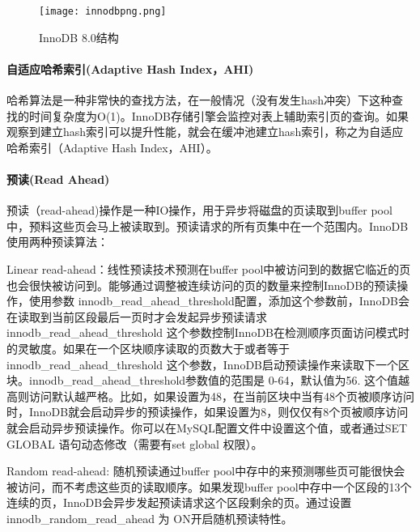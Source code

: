 \documentclass[../../../interview-questions.tex]{subfiles}
\begin{document}
\begin{figure}[htbp]
    \centering
    \texttt{[image: innodbpng.png]}
    \caption{InnoDB 8.0结构}
    \label{fig:innodbpng}
\end{figure}


\paragraph{自适应哈希索引(Adaptive Hash Index，AHI)}

哈希算法是一种非常快的查找方法，在一般情况（没有发生hash冲突）下这种查找的时间复杂度为O(1)。InnoDB存储引擎会监控对表上辅助索引页的查询。如果观察到建立hash索引可以提升性能，就会在缓冲池建立hash索引，称之为自适应哈希索引（Adaptive Hash Index，AHI）。

\paragraph{预读(Read Ahead)}

预读（read-ahead)操作是一种IO操作，用于异步将磁盘的页读取到buffer pool中，预料这些页会马上被读取到。预读请求的所有页集中在一个范围内。InnoDB使用两种预读算法：

Linear read-ahead：线性预读技术预测在buffer pool中被访问到的数据它临近的页也会很快被访问到。能够通过调整被连续访问的页的数量来控制InnoDB的预读操作，使用参数 innodb\_read\_ahead\_threshold配置，添加这个参数前，InnoDB会在读取到当前区段最后一页时才会发起异步预读请求
innodb\_read\_ahead\_threshold 这个参数控制InnoDB在检测顺序页面访问模式时的灵敏度。如果在一个区块顺序读取的页数大于或者等于 innodb\_read\_ahead\_threshold 这个参数，InnoDB启动预读操作来读取下一个区块。innodb\_read\_ahead\_threshold参数值的范围是 0-64，默认值为56. 这个值越高则访问默认越严格。比如，如果设置为48，在当前区块中当有48个页被顺序访问时，InnoDB就会启动异步的预读操作，如果设置为8，则仅仅有8个页被顺序访问就会启动异步预读操作。你可以在MySQL配置文件中设置这个值，或者通过SET GLOBAL 语句动态修改（需要有set global 权限）。

Random read-ahead: 随机预读通过buffer pool中存中的来预测哪些页可能很快会被访问，而不考虑这些页的读取顺序。如果发现buffer pool中存中一个区段的13个连续的页，InnoDB会异步发起预读请求这个区段剩余的页。通过设置 innodb\_random\_read\_ahead 为 ON开启随机预读特性。
\end{document}
